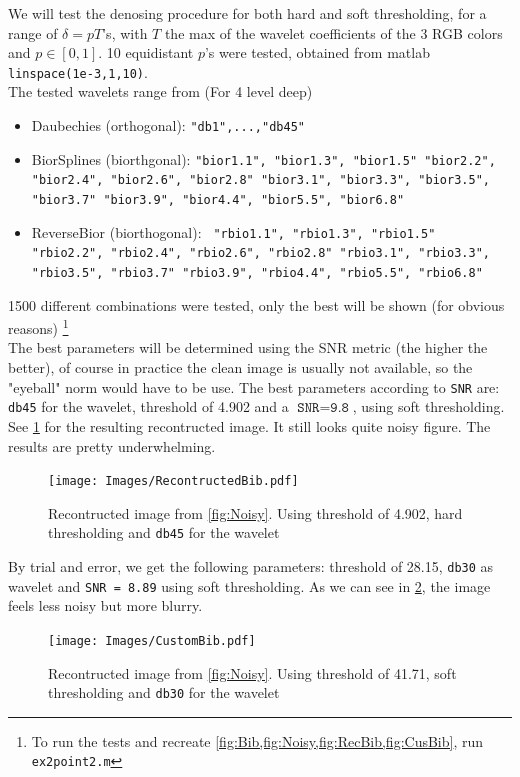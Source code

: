 \documentclass[a4paper]{article}
\begin{document}
	We will test the denosing procedure for both hard and soft thresholding, for a range of $\delta = p T$'s, with $T$ the max of the wavelet coefficients of the 3 RGB colors and $p \in [0,1]$. 10 equidistant $p$'s were tested, obtained from matlab \texttt{linspace(\texttt{1e-3},1,10)}. \\
	The tested wavelets range from (For 4 level deep)
	\begin{itemize}
		\item Daubechies (orthogonal): \texttt{"db1",...,"db45"}
		\item BiorSplines (biorthgonal): \texttt{"bior1.1", "bior1.3", "bior1.5"
			"bior2.2", "bior2.4", "bior2.6", "bior2.8"
			"bior3.1", "bior3.3", "bior3.5", "bior3.7"
			"bior3.9", "bior4.4", "bior5.5", "bior6.8"}	
		\item ReverseBior (biorthogonal): \texttt{	"rbio1.1", "rbio1.3", "rbio1.5"
			"rbio2.2", "rbio2.4", "rbio2.6", "rbio2.8"	
			"rbio3.1", "rbio3.3", "rbio3.5", "rbio3.7"
			"rbio3.9", "rbio4.4", "rbio5.5", "rbio6.8"}
	\end{itemize}
	1500 different combinations were tested, only the best will be shown (for obvious reasons) \footnote{To run the tests and recreate \cref{fig:Bib,fig:Noisy,fig:RecBib,fig:CusBib}, run \texttt{ex2point2.m}} \\
	
	The best parameters will be determined using the SNR metric (the higher the better), of course in practice the clean image is usually not available, so the "eyeball" norm would have to be use. The best parameters according to \texttt{SNR} are: \texttt{db45} for the wavelet, threshold of 4.902 and a $\texttt{SNR} = \texttt{9.8}$, using soft thresholding. See \cref{fig:RecBib} for the resulting recontructed image. It still looks quite noisy figure. The results are pretty underwhelming.

    \begin{figure}[H]
	\centering
	\texttt{[image: Images/RecontructedBib.pdf]}
	\caption{Recontructed image from \cref{fig:Noisy}. Using threshold of 4.902, hard thresholding and \texttt{db45} for the wavelet}
	\label{fig:RecBib}
\end{figure}
	
	By trial and error, we get the following parameters: threshold of 28.15, \texttt{db30} as wavelet and \texttt{SNR = 8.89} using soft thresholding. As we can see in \cref{fig:CusBib}, the image feels less noisy but more blurry.
	
    \begin{figure}[H]
	\centering
	\texttt{[image: Images/CustomBib.pdf]}
	\caption{Recontructed image from \cref{fig:Noisy}. Using threshold of 41.71, soft thresholding and \texttt{db30} for the wavelet}
	\label{fig:CusBib}
\end{figure}
	
\end{document}
